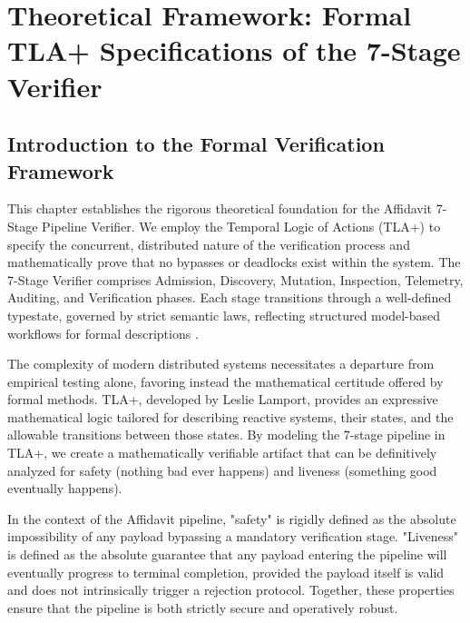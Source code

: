 \chapter{Theoretical Framework: Formal TLA+ Specifications of the 7-Stage Verifier}
\label{ch:theory_tla}

\section{Introduction to the Formal Verification Framework}
This chapter establishes the rigorous theoretical foundation for the Affidavit 7-Stage Pipeline Verifier. We employ the Temporal Logic of Actions (TLA+) to specify the concurrent, distributed nature of the verification process and mathematically prove that no bypasses or deadlocks exist within the system. The 7-Stage Verifier comprises Admission, Discovery, Mutation, Inspection, Telemetry, Auditing, and Verification phases. Each stage transitions through a well-defined typestate, governed by strict semantic laws, reflecting structured model-based workflows for formal descriptions \cite{ref_ModelbasedWorkf24}.

The complexity of modern distributed systems necessitates a departure from empirical testing alone, favoring instead the mathematical certitude offered by formal methods. TLA+, developed by Leslie Lamport, provides an expressive mathematical logic tailored for describing reactive systems, their states, and the allowable transitions between those states. By modeling the 7-stage pipeline in TLA+, we create a mathematically verifiable artifact that can be definitively analyzed for safety (nothing bad ever happens) and liveness (something good eventually happens).

In the context of the Affidavit pipeline, "safety" is rigidly defined as the absolute impossibility of any payload bypassing a mandatory verification stage. "Liveness" is defined as the absolute guarantee that any payload entering the pipeline will eventually progress to terminal completion, provided the payload itself is valid and does not intrinsically trigger a rejection protocol. Together, these properties ensure that the pipeline is both strictly secure and operatively robust.


